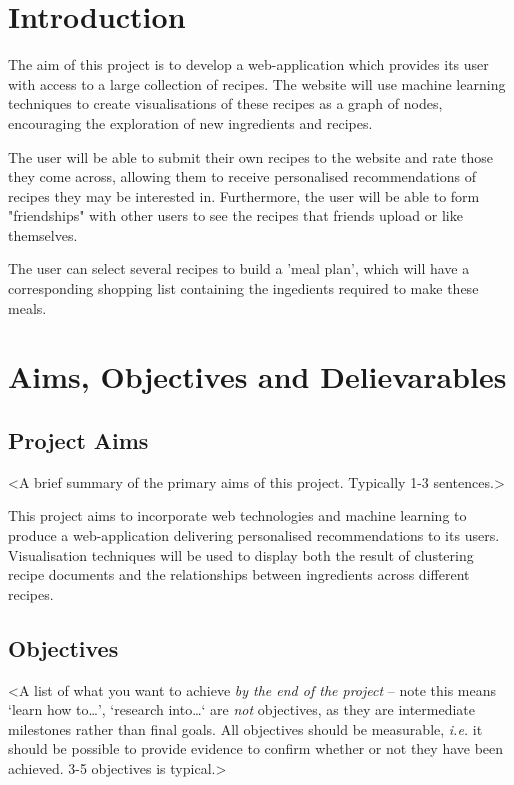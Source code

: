 %
%
\section{Introduction}

The aim of this project is to develop a web-application which provides its user with access to a large collection of recipes. The website will use machine learning techniques to create visualisations of these recipes as a graph of nodes, encouraging the exploration of new ingredients and recipes.

The user will be able to submit their own recipes to the website and rate those they come across, allowing them to receive personalised recommendations of recipes they may be interested in. Furthermore, the user will be able to form "friendships" with other users to see the recipes that friends upload or like themselves.

The user can select several recipes to build a 'meal plan', which will have a corresponding shopping list containing the ingedients required to make these meals. 

%
%
\section{Aims, Objectives and Delievarables}

\subsection{Project Aims}
<A brief summary of the primary aims of this project. Typically 1-3 sentences.>

This project aims to incorporate web technologies and machine learning to produce a web-application delivering personalised recommendations to its users. 
Visualisation techniques will be used to display both the result of clustering recipe documents and the relationships between ingredients across different recipes.
\subsection{Objectives}

<A list of what you want to achieve {\em by the end of the project} -- note this means `learn how to\ldots', `research into\ldots` are {\em not} objectives, as they are intermediate milestones rather than final goals. All objectives should be measurable, {\em i.e.} it should be possible to provide evidence to confirm whether or not they have been achieved. 3-5 objectives is typical.>

